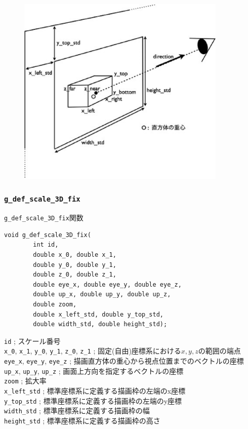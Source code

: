 \documentclass[platex,a4paper,12pt]{jsarticle}%
\begin{document}
\begin{figure}[htb]
\centering
\includegraphics[width=100mm]{Canvas_g_def_scale_3D.eps}
\end{figure}




\clearpage
\subsubsection{\texttt{g\_def\_scale\_3D\_fix}}

\begin{itembox}[l]{\texttt{g\_def\_scale\_3D\_fix}関数}
\begin{verbatim}
void g_def_scale_3D_fix(
        int id,
        double x_0, double x_1,
        double y_0, double y_1,
        double z_0, double z_1,
        double eye_x, double eye_y, double eye_z,
        double up_x, double up_y, double up_z, 
        double zoom, 
        double x_left_std, double y_top_std,
        double width_std, double height_std);
\end{verbatim}
\verb|id| ; スケール番号 \\
\verb|x_0|, \verb|x_1|, \verb|y_0|, \verb|y_1|, \verb|z_0|, \verb|z_1| ; 固定(自由)座標系における$x, y, z$の範囲の端点 \\
\verb|eye_x|, \verb|eye_y|, \verb|eye_z| ; 描画直方体の重心から視点位置までのベクトルの座標 \\
\verb|up_x|, \verb|up_y|, \verb|up_z| ; 画面上方向を指定するべクトルの座標 \\
\verb|zoom| ; 拡大率 \\
\verb|x_left_std| ; 標準座標系に定義する描画枠の左端のx座標 \\
\verb|y_top_std| ; 標準座標系に定義する描画枠の左端のy座標 \\
\verb|width_std| ; 標準座標系に定義する描画枠の幅 \\
\verb|height_std| ; 標準座標系に定義する描画枠の高さ
\end{itembox}
\end{document}
